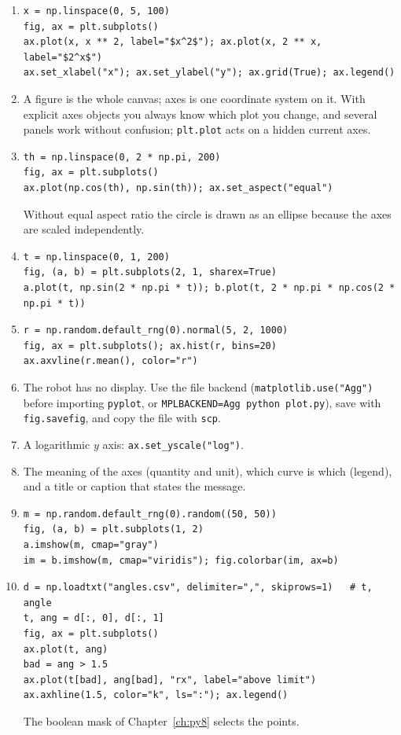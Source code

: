 \begin{enumerate}[label=\textbf{\ansnum.\arabic*}]
  \item
\begin{verbatim}
x = np.linspace(0, 5, 100)
fig, ax = plt.subplots()
ax.plot(x, x ** 2, label="$x^2$"); ax.plot(x, 2 ** x, label="$2^x$")
ax.set_xlabel("x"); ax.set_ylabel("y"); ax.grid(True); ax.legend()
\end{verbatim}
  \item A figure is the whole canvas; axes is one coordinate system on it. With explicit axes objects you always know which plot you change, and several panels work without confusion; \texttt{plt.plot} acts on a hidden current axes.
  \item
\begin{verbatim}
th = np.linspace(0, 2 * np.pi, 200)
fig, ax = plt.subplots()
ax.plot(np.cos(th), np.sin(th)); ax.set_aspect("equal")
\end{verbatim}
  Without equal aspect ratio the circle is drawn as an ellipse because the axes are scaled independently.
  \item
\begin{verbatim}
t = np.linspace(0, 1, 200)
fig, (a, b) = plt.subplots(2, 1, sharex=True)
a.plot(t, np.sin(2 * np.pi * t)); b.plot(t, 2 * np.pi * np.cos(2 * np.pi * t))
\end{verbatim}
  \item
\begin{verbatim}
r = np.random.default_rng(0).normal(5, 2, 1000)
fig, ax = plt.subplots(); ax.hist(r, bins=20)
ax.axvline(r.mean(), color="r")
\end{verbatim}
  \item The robot has no display. Use the file backend (\verb!matplotlib.use("Agg")! before importing \texttt{pyplot}, or \verb!MPLBACKEND=Agg python plot.py!), save with \texttt{fig.savefig}, and copy the file with \texttt{scp}.
  \item A logarithmic $y$ axis: \verb!ax.set_yscale("log")!.
  \item The meaning of the axes (quantity and unit), which curve is which (legend), and a title or caption that states the message.
  \item
\begin{verbatim}
m = np.random.default_rng(0).random((50, 50))
fig, (a, b) = plt.subplots(1, 2)
a.imshow(m, cmap="gray")
im = b.imshow(m, cmap="viridis"); fig.colorbar(im, ax=b)
\end{verbatim}
  \item[\textbf{\ansnum.10}]
\begin{verbatim}
d = np.loadtxt("angles.csv", delimiter=",", skiprows=1)   # t, angle
t, ang = d[:, 0], d[:, 1]
fig, ax = plt.subplots()
ax.plot(t, ang)
bad = ang > 1.5
ax.plot(t[bad], ang[bad], "rx", label="above limit")
ax.axhline(1.5, color="k", ls=":"); ax.legend()
\end{verbatim}
  The boolean mask of Chapter~\ref{ch:py8} selects the points.
\end{enumerate}
